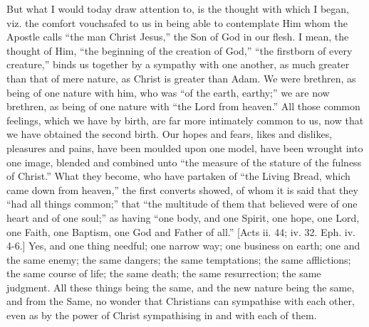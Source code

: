 But what I would today draw attention to, is the thought with which
I began, viz. the comfort vouchsafed to us in being able to
contemplate Him whom the Apostle calls ``the man Christ
Jesus,'' the Son of God in our flesh. I mean, the thought of Him,
``the beginning of the creation of God,'' ``the firstborn
of every creature,'' binds us together by a sympathy with one
another, as much greater than that of mere nature, as Christ is
greater than Adam. We were brethren, as being of one nature with him,
who was ``of the earth, earthy;'' we are now brethren, as
being of one nature with ``the Lord from heaven.'' All those
common feelings, which we have by birth, are far more intimately
common to us, now that we have obtained the second birth. Our hopes
and fears, likes and dislikes, pleasures and pains, have been moulded
upon one model, have been wrought into one image, blended and combined
unto ``the measure of the stature of the fulness of Christ.''
What they become, who have partaken of ``the Living Bread, which
came down from heaven,'' the first converts showed, of whom it is
said that they ``had all things common;'' that ``the
multitude of them that believed were of one heart and of one
soul;'' as having ``one body, and one Spirit, one hope, one
Lord, one Faith, one Baptism, one God and Father of all.'' [Acts
ii. 44; iv. 32. Eph. iv. 4-6.] Yes, and one thing needful; one narrow
way; one business on earth; one and the same enemy; the same dangers;
the same temptations; the same afflictions; the same course of life;
the same death; the same resurrection; the same judgment. All these
things being the same, and the new nature being the same, and from the
Same, no wonder that Christians can sympathise with each other, even
as by the power of Christ sympathising in and with each of them.

